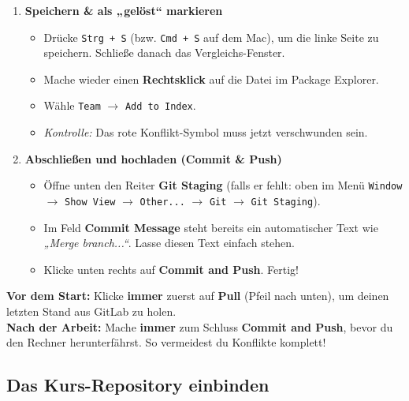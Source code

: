 \begin{enumerate}[label=\textbf{Schritt \arabic*:}, leftmargin=*, itemsep=0em]
    \item \textbf{Speichern \& als „gelöst“ markieren}
    \begin{itemize}[label=\textbullet]
        \item Drücke \texttt{Strg + S} (bzw. \texttt{Cmd + S} auf dem Mac), um die 
		linke Seite zu speichern. Schließe danach das Vergleichs-Fenster.
        \item Mache wieder einen \textbf{Rechtsklick} auf die Datei im Package 
		Explorer.
        \item Wähle \texttt{Team} $\rightarrow$ \texttt{Add to Index}.
        \item \textit{Kontrolle:} Das rote Konflikt-Symbol muss jetzt verschwunden 
		sein.
    \end{itemize}

    \item \textbf{Abschließen und hochladen (Commit \& Push)}
    \begin{itemize}[label=\textbullet]
        \item Öffne unten den Reiter \textbf{Git Staging} (falls er fehlt: oben im 
		Menü \texttt{Window} $\rightarrow$ \texttt{Show View} $\rightarrow$ 
		\texttt{Other...} $\rightarrow$ \texttt{Git} $\rightarrow$ \texttt{Git Staging}).
        \item Im Feld \textbf{Commit Message} steht bereits ein automatischer Text 
		wie \textit{„Merge branch...“}. Lasse diesen Text einfach stehen.
        \item Klicke unten rechts auf \textbf{Commit and Push}. Fertig!
    \end{itemize}

\end{enumerate}

\vspace{0.5cm}

\begin{tcolorbox}[colback=yellow!10!white, colframe=orange!80!black, title=\faLightbulb\ \textbf{Goldene Regel für den Wechsel zwischen Schule und Zuhause}]
\textbf{Vor dem Start:} Klicke \textbf{immer} zuerst auf \textbf{Pull} (Pfeil nach 
unten), um deinen letzten Stand aus GitLab zu holen.\\
\textbf{Nach der Arbeit:} Mache \textbf{immer} zum Schluss \textbf{Commit and Push}, 
bevor du den Rechner herunterfährst. So vermeidest du Konflikte komplett!
\end{tcolorbox}



\subsection{Das Kurs-Repository einbinden}

